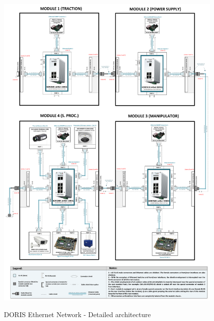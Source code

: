 \begin{figure}
  \centering
  \includegraphics[angle=90,width=1\columnwidth]{figs/body01/FIGETHERNETDIAGRAM.pdf}\\
  \caption[DORIS Ethernet Network - Detailed architecture]{DORIS Ethernet Network - Detailed architecture}
  \label{FIG:ETHERNETDIAGRAM}
\end{figure}
